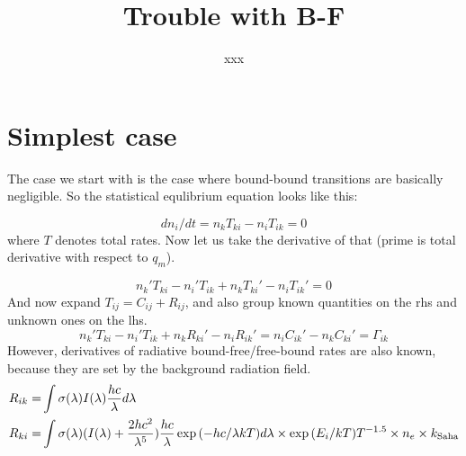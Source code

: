 \documentclass[a4paper,10pt]{article}
\title{Trouble with B-F}
\author{xxx}
\begin{document}
\maketitle



\section{Simplest case}

The case we start with is the case where bound-bound transitions are basically negligible. So the statistical equlibrium equation looks like this:

\begin{equation}
 dn_i/dt = n_k T_{ki} - n_i T_{ik} = 0
\end{equation}
where $T$ denotes total rates. Now let us take the derivative of that (prime is total derivative with respect to $q_m$). 

\begin{equation}
 n_k' T_{ki} - n_i' T_{ik} + n_k T_{ki}' - n_i T_{ik}' = 0
\end{equation}
And now expand $T_{ij} = C_{ij} + R_{ij}$, and also group known quantities on the rhs and unknown ones on the lhs.
\begin{equation}
n_k' T_{ki} - n_i' T_{ik} + n_k R_{ki}' - n_i R_{ik}' = n_i C_{ik}' - n_k C_{ki}' = \Gamma_{ik}
\label{SEder}
\end{equation}
However, derivatives of radiative bound-free/free-bound rates are also known, because they are set by the background radiation field.
\begin{align}
 R_{ik} = & \int \sigma(\lambda) I(\lambda) \frac{hc}{\lambda} d\lambda \\
 R_{ki} = & \int \sigma(\lambda) (I(\lambda) + \frac{2hc^2}{\lambda^5}) \frac{hc}{\lambda}  \exp{(-hc/ \lambda k T)}  d\lambda \times  \exp{(E_i/kT)}  T^{-1.5} \times n_e \times k_{\rm Saha}
\end{align}
\end{document}
